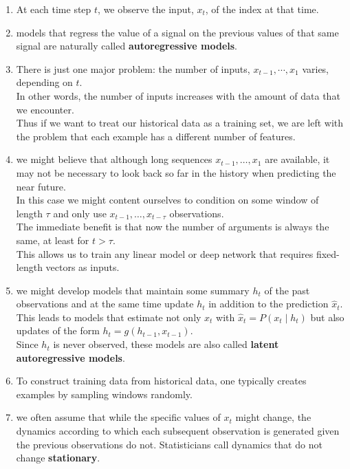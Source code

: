 \begin{enumerate}
    \item At each time step $t$, we observe the input, $x_t$, of the index at that time.

    \item models that regress the value of a signal on the previous values of that same signal are naturally called \textbf{autoregressive models}.

    \item There is just one major problem: the number of inputs, $x_{t-1}, \cdots, x_1$ varies, depending on $t$.\\
    In other words, the number of inputs increases with the amount of data that we encounter. \\
    Thus if we want to treat our historical data as a training set, we are left with the problem that each example has a different number of features.

    \item we might believe that although long sequences $x_{t-1}, \ldots, x_1$ are available, it may not be necessary to look back so far in the history when predicting the near future.\\
    In this case we might content ourselves to condition on some window of length $\tau$ and only use $x_{t-1}, \ldots, x_{t-\tau}$ observations.\\
    The immediate benefit is that now the number of arguments is always the same, at least for $t > \tau$.\\
    This allows us to train any linear model or deep network that requires fixed-length vectors as inputs.

    \item we might develop models that maintain some summary $h_t$ of the past observations and at the same time update $h_t$ in addition to the prediction $\hat{x}_t$.\\
    This leads to models that estimate not only $x_t$ with $\hat{x}_t = P(x_t \mid h_{t})$ but also updates of the form $h_t = g(h_{t-1}, x_{t-1})$. \\
    Since $h_t$ is never observed, these models are also called \textbf{latent autoregressive models}.

    \item To construct training data from historical data, one typically creates examples by sampling windows randomly.

    \item we often assume that while the specific values of $x_t$ might change, the dynamics according to which each subsequent observation is generated given the previous observations do not. Statisticians call dynamics that do not change \textbf{stationary}.
    
\end{enumerate}




